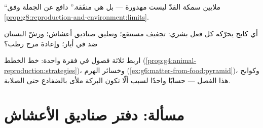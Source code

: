 \begin{exercise}[$\star\star$]\label{exo:g8:reproduction-and-environment:10}
``ملايين سمكة القدّ ليست مهدورة --- بل هي منفَقة.'' دافع عن
الجملة وفق \cref{prop:g8:reproduction-and-environment:limits}.
\end{exercise}

\begin{exercise}[$\star\star$]\label{exo:g8:reproduction-and-environment:11}
أي كابح يحرّكه كل فعل بشري: تجفيف مستنقع؛ وتعليق صناديق أعشاش؛
ورشّ البستان ضد  في أيار؛ وإعادة مرج رطب؟
\end{exercise}

\begin{exercise}[$\star\star\star$]\label{exo:g8:reproduction-and-environment:12}
اربط ثلاثة فصول في فقرة واحدة: خط الخطط
(\cref{prop:g4:animal-reproduction:strategies})، وخسائر الهرم
(\cref{ex:g6:matter-from-food:pyramid})، وكوابح هذا الفصل ---
حسابًا واحدًا لسبب ألّا تكون البركة ملأى بالضفادع حتى الصلابة.
\end{exercise}

\section{مسألة: دفتر صناديق الأعشاش}


